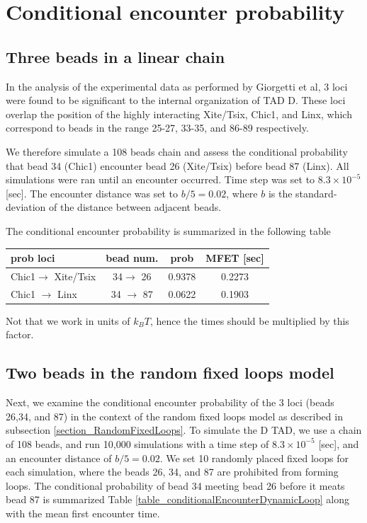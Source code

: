 \documentclass[12pt]{book}
\begin{document}
\section{Conditional encounter probability}

\subsection{Three beads in a linear chain}\label{subsection_conditionalEncounter3BeadsInALinearChain}

In the analysis of the experimental data as performed by Giorgetti et al\cite{giorgetti2014predictive}, 3 loci were found to be significant to the internal organization of TAD D. These loci overlap the position of the highly interacting Xite/Tsix, Chic1, and Linx, which correspond to beads in the range 25-27, 33-35, and 86-89 respectively.

We therefore simulate a 108 beads chain and assess the conditional probability that  bead 34 (Chic1) encounter bead 26 (Xite/Tsix) before bead 87 (Linx). All simulations were ran until an encounter occurred. Time step was set to $8.3\times 10^{-5}$ [sec]. The encounter distance was set to $b/5=0.02$, where $b$ is the standard-deviation of the distance between adjacent beads. 

The conditional encounter probability is summarized in the following table 
\begin{table}[H]
\begin{tabular}{l |c| c |c |}
 prob loci                    & bead num.           & prob & MFET [sec]\\
\hline
 Chic1$\rightarrow$ Xite/Tsix & 34$\rightarrow$ 26  & 0.9378 & 0.2273\\
 Chic1 $\rightarrow$ Linx     & 34 $\rightarrow$ 87 & 0.0622 & 0.1903
\end{tabular}
\end{table}
Not that we work in units of $k_BT$, hence the times should be multiplied by this factor. 

\subsection{Two beads in the random fixed loops model}\label{subsection_conditionalEncounter2BeadsInTheRandomFixedLoopModel}
Next, we examine the conditional encounter probability of the 3 loci (beads 26,34, and 87) in the context of the random fixed loops model as described in subsection \ref{section_RandomFixedLoops}. To simulate the D TAD, we use a chain of 108 beads, and run 10,000 simulations with a time step of $8.3\times 10^{-5}$ [sec], and an encounter distance of $b/5=0.02$. We set 10 randomly placed fixed loops for each simulation, where the beads 26, 34, and 87 are prohibited from forming loops. The conditional probability of bead 34 meeting bead 26 before it meats bead 87 is summarized Table \ref{table_conditionalEncounterDynamicLoop} along with the mean first encounter time.
\end{document}

